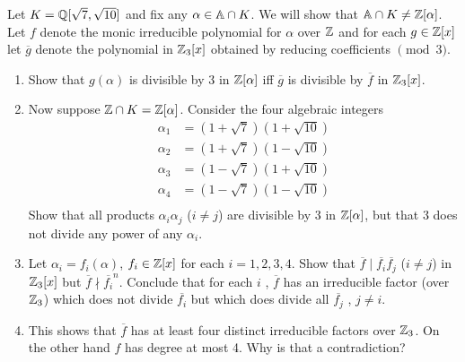 \begin{exe}{2.30} Let $K = \QQ[\sqrt{7},\sqrt{10}]$ and fix any $\alpha \in \AA \cap K$. We will show that $\AA \cap K \neq \ZZ[\alpha]$. Let $f$ denote the monic irreducible polynomial for $\alpha$ over $\ZZ$ and for each $g \in \ZZ[x]$ let $\overline{g}$ denote the polynomial in $\ZZ_3[x]$ obtained by reducing coefficients $\pmod{3}$.
\begin{enumerate}
\item Show that $g(\alpha)$ is divisible by 3 in $\ZZ[\alpha]$ iff $\overline{g}$ is divisible by $\overline{f}$ in $\ZZ_3[x]$.
\item Now suppose $\ZZ \cap K = \ZZ[\alpha]$. Consider the four algebraic integers
\begin{align*}
\alpha_1 &= (1+\sqrt{7})(1+\sqrt{10}) \\
\alpha_2 &= (1+\sqrt{7})(1-\sqrt{10}) \\
\alpha_3 &= (1-\sqrt{7})(1+\sqrt{10}) \\
\alpha_4 &= (1-\sqrt{7})(1-\sqrt{10}) \\
\end{align*}
Show that all products $\alpha_i\alpha_j$ ($i \neq j$) are divisible by 3 in $\ZZ[\alpha]$, but that 3 does not divide any power of any $\alpha_i$.
\item Let $\alpha_i = f_i(\alpha)$, $f_i \in \ZZ[x]$ for each $i=1,2,3,4$. Show that $\overline{f} \mid \overline{f_i}\overline{f_j}$ ($i \neq j$) in $\ZZ_3[x]$ but $\overline{f} \nmid \overline{f_i}^n$. Conclude that for each $i$ , $\overline{f}$ has an irreducible factor (over $\ZZ_3$) which does not divide $\overline{f_i}$ but which does divide all $\overline{f_j}$ , $j \neq i$.
\item This shows that $\overline{f}$ has at least four distinct irreducible factors over $\ZZ_3$. On the other hand $f$ has degree at most 4. Why is that a contradiction?
\end{enumerate} \end{exe} 
